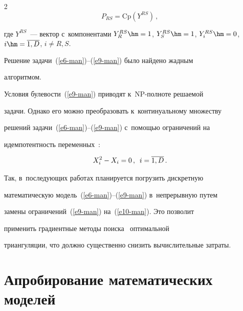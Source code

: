 \begin{multicols}{2}
  $$ 


  P_{RS}=\mathrm{Cp}\left( Y^{RS}\right)\,,


  $$


где $Y^{RS}$~--- вектор с~компонентами $Y_R^{RS}\hm= 1$, $Y_S^{RS}\hm= 


1$, $Y_i^{RS}\hm= 0$, $i\hm=\overline{1,D}$, $i\not= R, S$.


  


  Решение задачи~(\ref{e6-man})--(\ref{e9-man}) было найдено жад\-ным 


алгоритмом.


  


  Условия булевости~(\ref{e9-man}) приводят к~NP-пол\-но\-те ре\-ша\-емой 


задачи. Однако его мож\-но преобразовать к~континуальному множеству 


решений задачи~(\ref{e6-man})--(\ref{e9-man}) с~по\-мощью ограничений на 


идемпотентность переменных~\cite{12-man}:


  \begin{equation}


  X_i^2-X_i=0\,,\enskip i=\overline{1,D}\,.


  \label{e10-man}


  \end{equation}


  


  Так, в~последующих работах планируется погрузить дискретную 


математическую модель~(\ref{e6-man})--(\ref{e9-man}) в~непрерывную путем 


замены ограничений~(\ref{e9-man}) на~(\ref{e10-man}). Это позволит 


применить градиентные методы поиска~\cite{13-man} оптимальной 


триангуляции, что должно существенно снизить вы\-чис\-ли\-тель\-ные затраты.





\vspace*{-6pt}





\section{Апробирование математических моделей}






\end{multicols}
